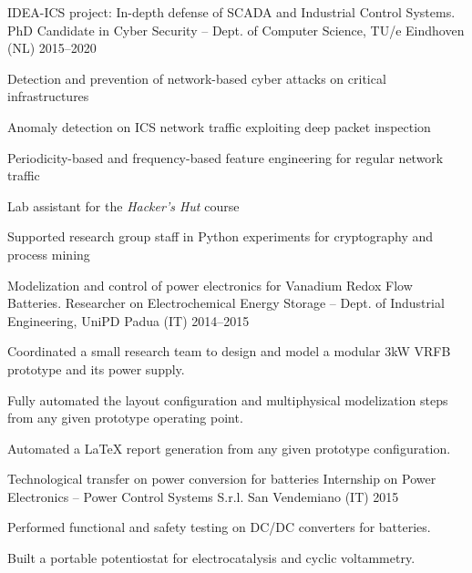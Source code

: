 
\begin{cventries}
    \cventry%
        {{IDEA-ICS} project: In-depth defense of SCADA and Industrial Control Systems.} %
        {PhD Candidate in Cyber Security -- Dept. of Computer Science, TU/e} %
        {Eindhoven (NL)} %
        {2015--2020} %
        {\begin{cvitems}
            \item Detection and prevention of network-based cyber attacks on critical infrastructures
            \item Anomaly detection on ICS network traffic exploiting deep packet inspection
            \item Periodicity-based and frequency-based feature engineering for regular network traffic
            \item Lab assistant for the \emph{Hacker's Hut} course
            \item Supported research group staff in Python experiments for cryptography and process mining
        \end{cvitems}}


    \cventry%
        {Modelization and control of power electronics for Vanadium Redox Flow Batteries.}
        {Researcher on Electrochemical Energy Storage -- Dept. of Industrial Engineering, UniPD}
        {Padua (IT)}
        {2014--2015}
        {\begin{cvitems}
            \item Coordinated a small research team to design and model a modular 3kW VRFB prototype and its power supply.
            \item Fully automated the layout configuration and multiphysical modelization steps from any given prototype operating point.
            \item Automated a LaTeX report generation from any given prototype configuration.
        \end{cvitems}}

    \cventry%
        {Technological transfer on power conversion for batteries}
        {Internship on Power Electronics -- Power Control Systems S.r.l.}
        {San Vendemiano (IT)}
        {2015}
        {\begin{cvitems}
            \item Performed functional and safety testing on DC/DC converters for batteries.
            \item Built a portable potentiostat for electrocatalysis and cyclic voltammetry.
        \end{cvitems}}


\end{cventries}
